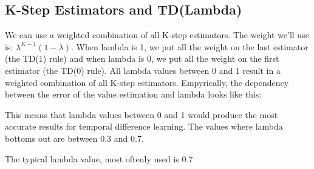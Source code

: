 \documentclass{article}
\begin{document}
\subsection{K-Step Estimators and TD(Lambda)}
We can use a weighted combination of all K-step estimators. The weight we'll use is: $\lambda^{K - 1} (1 - \lambda)$. When lambda is 1, we put all the weight on the last estimator (the TD(1) rule) and when lambda is 0, we put all the weight on the first estimator (the TD(0) rule). All lambda values between 0 and 1 result in a weighted combination of all K-step estimators. Empyrically, the dependency between the error of the value estimation and lambda looks like this: \newline
{}
This means that lambda values between 0 and 1 would produce the most accurate results for temporal difference learning. The values where lambda bottoms out are between 0.3 and 0.7.
\begin{framed}
  The typical lambda value, most oftenly used is 0.7
\end{framed}
\end{document}
